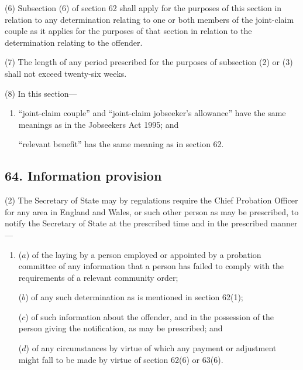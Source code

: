 \documentclass[12pt,a4paper]{article}
\begin{document}
(6) Subsection (6)  of section 62 shall apply for the purposes of this section in relation to any determination relating to one or both members of the joint-claim couple as it applies for the purposes of that section in relation to the determination relating to the offender.

(7) The length of any period prescribed for the purposes of subsection (2)  or (3)  shall not exceed twenty-six weeks.

(8) In this section—
\begin{enumerate}\item[]
    “joint-claim couple” and “joint-claim jobseeker’s allowance” have the same meanings as in the Jobseekers Act 1995; and

    “relevant benefit” has the same meaning as in section 62.  
\end{enumerate}


\subsection{64. Information provision}


(2) The Secretary of State may by regulations require the Chief Probation Officer for any area in England and Wales, or such other person as may be prescribed, to notify the Secretary of State at the prescribed time and in the prescribed manner—
\begin{enumerate}\item[]
($a$) of the laying by a person employed or appointed by a probation committee of any information that a person has failed to comply with the requirements of a relevant community order;

($b$) of any such determination as is mentioned in section 62(1);

($c$) of such information about the offender, and in the possession of the person giving the notification, as may be prescribed; and

($d$) of any circumstances by virtue of which any payment or adjustment might fall to be made by virtue of section 62(6)  or 63(6).
\end{enumerate}
\end{document}
